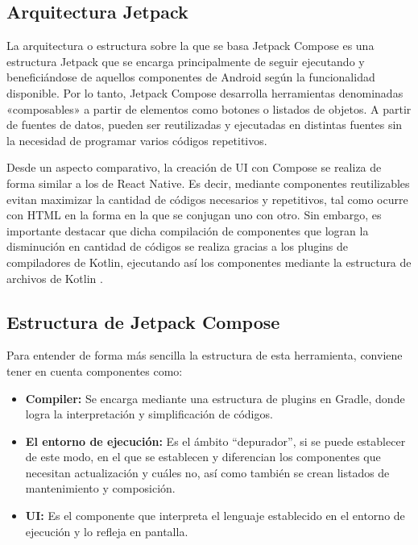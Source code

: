 \subsection*{Arquitectura Jetpack}
La arquitectura o estructura sobre la que se basa Jetpack Compose es una estructura Jetpack que se encarga principalmente de seguir ejecutando y beneficiándose de aquellos componentes de Android según la funcionalidad disponible. Por lo tanto, Jetpack Compose desarrolla herramientas denominadas «composables» a partir de elementos como botones o listados de objetos. A partir de fuentes de datos, pueden ser reutilizadas y ejecutadas en distintas fuentes sin la necesidad de programar varios códigos repetitivos.

Desde un aspecto comparativo, la creación de UI con Compose se realiza de forma similar a los de React Native. Es decir, mediante componentes reutilizables evitan maximizar la cantidad de códigos necesarios y repetitivos, tal como ocurre con HTML en la forma en la que se conjugan uno con otro. Sin embargo, es importante destacar que dicha compilación de componentes que logran la disminución en cantidad de códigos se realiza gracias a los plugins de compiladores de Kotlin, ejecutando así los componentes mediante la estructura de archivos de Kotlin \cite{CitaA19}. 

\subsection*{Estructura de Jetpack Compose}
Para entender de forma más sencilla la estructura de esta herramienta, conviene tener en cuenta componentes como:
\begin{itemize}
	\item \textbf{Compiler:} Se encarga mediante una estructura de plugins en Gradle, donde logra la interpretación y simplificación de códigos.
	\item \textbf{El entorno de ejecución:} Es el ámbito “depurador”, si se puede establecer de este modo, en el que se establecen y diferencian los componentes que necesitan actualización y cuáles no, así como también se crean listados de mantenimiento y composición.
	\item \textbf{UI:} Es el componente que interpreta el lenguaje establecido en el entorno de ejecución y lo refleja en pantalla.
\end{itemize}
